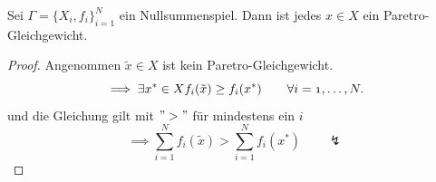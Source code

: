 \begin{satz}
	Sei $\Gamma = \{X_{i}, f_{i}\}_{i=1}^{N}$ ein
	Nullsummenspiel.  Dann ist jedes $x \in X$ ein
	Paretro-Gleichgewicht.
\end{satz}

\begin{proof}
	Angenommen $\tilde{x} \in X$ ist kein Paretro-Gleichgewicht.
	\[
		\implies \exists x^{*} \in X \mit f_{i}(\tilde{x}) \geq f_{i}(x^{*}) \qquad \forall i=1, \ldots, N
	.\] und die Gleichung gilt mit $">"$ für mindestens ein $i$
	\[
		\implies \sum_{i=1}^{N}{f_{i}(\tilde{x})} > \sum_{i=1}^{N}{f_{i}(x^{*})} \qquad \lightning
	\] 
\end{proof}
